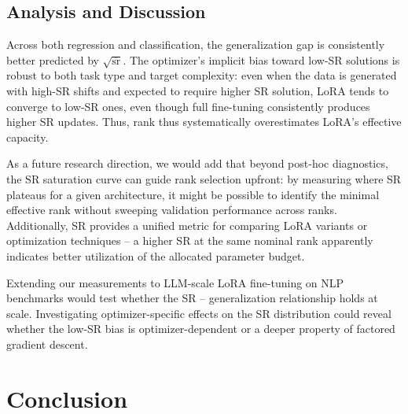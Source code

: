 \documentclass[a4paper,14pt]{extarticle}
\DeclareMathOperator{\sr}{sr}
\begin{document}
    \subsection{Analysis and Discussion}
    \label{sec:analysis}

    Across both regression and classification, the generalization gap is consistently better predicted by $\sqrt{\overline{\sr}}$. The optimizer's implicit bias toward low-SR solutions is robust to both task type and target complexity: even when the data is generated with high-SR shifts and expected to require higher SR solution, LoRA tends to converge to low-SR ones, even though full fine-tuning consistently produces higher SR updates. Thus, rank thus systematically overestimates LoRA's effective capacity.

    As a future research direction, we would add that beyond post-hoc diagnostics, the SR saturation curve can guide rank selection upfront: by measuring where SR plateaus for a given architecture, it might be possible to identify the minimal effective rank without sweeping validation performance across ranks. Additionally, SR provides a unified metric for comparing LoRA variants or optimization techniques -- a higher SR at the same nominal rank apparently indicates better utilization of the allocated parameter budget.

    Extending our measurements to LLM-scale LoRA fine-tuning on NLP benchmarks would test whether the SR -- generalization relationship holds at scale. Investigating optimizer-specific effects on the SR distribution could reveal whether the low-SR bias is optimizer-dependent or a deeper property of factored gradient descent.




    \section{Conclusion}

    
\end{document}
